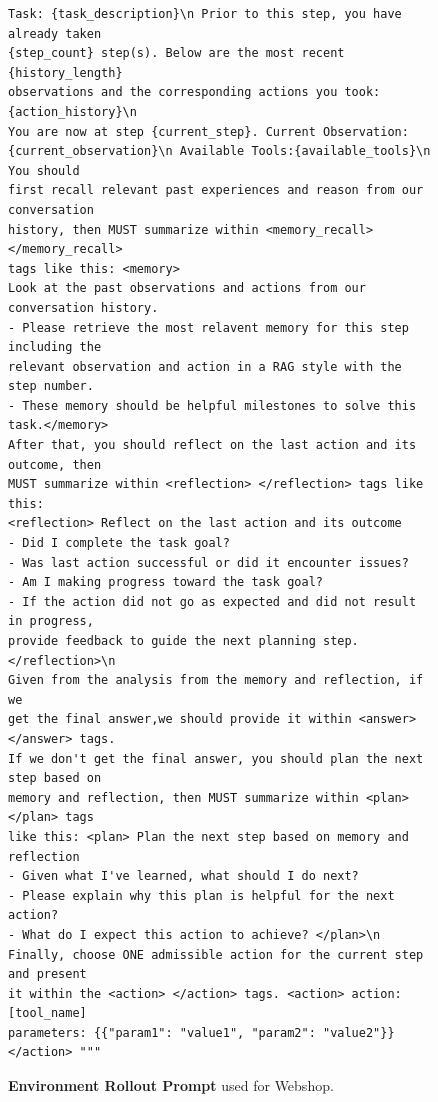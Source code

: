 \begin{figure}[htbp]
\begin{tcolorbox}
\begin{verbatim}
Task: {task_description}\n Prior to this step, you have already taken 
{step_count} step(s). Below are the most recent {history_length} 
observations and the corresponding actions you took: {action_history}\n 
You are now at step {current_step}. Current Observation: 
{current_observation}\n Available Tools:{available_tools}\n  You should 
first recall relevant past experiences and reason from our conversation 
history, then MUST summarize within <memory_recall> </memory_recall> 
tags like this: <memory>
Look at the past observations and actions from our conversation history.
- Please retrieve the most relavent memory for this step including the 
relevant observation and action in a RAG style with the step number.
- These memory should be helpful milestones to solve this task.</memory>
After that, you should reflect on the last action and its outcome, then 
MUST summarize within <reflection> </reflection> tags like this:
<reflection> Reflect on the last action and its outcome
- Did I complete the task goal?
- Was last action successful or did it encounter issues?
- Am I making progress toward the task goal?
- If the action did not go as expected and did not result in progress, 
provide feedback to guide the next planning step. </reflection>\n 
Given from the analysis from the memory and reflection, if we 
get the final answer,we should provide it within <answer></answer> tags.
If we don't get the final answer, you should plan the next step based on 
memory and reflection, then MUST summarize within <plan> </plan> tags 
like this: <plan> Plan the next step based on memory and reflection
- Given what I've learned, what should I do next?
- Please explain why this plan is helpful for the next action?
- What do I expect this action to achieve? </plan>\n
Finally, choose ONE admissible action for the current step and present 
it within the <action> </action> tags. <action> action: [tool_name]  
parameters: {{"param1": "value1", "param2": "value2"}}</action> """
\end{verbatim}
\end{tcolorbox}
\vspace{-1em}
\caption{\textbf{Environment Rollout Prompt} used for Webshop.}
\label{fig:taskscore_prompt}
\end{figure}




